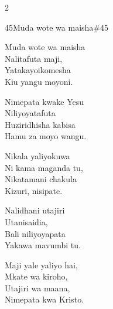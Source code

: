 \documentclass{article}
\begin{document}
\begin{multicols}{2}
\begin{hymn}{45}{Muda wote wa maisha}{\#45}
\begin{stanza}
Muda wote wa maisha\\
Nalitafuta maji,\\
Yatakayoikomesha\\
Kiu yangu moyoni.
\end{stanza}
\begin{chorus}
Nimepata kwake Yesu\\
Niliyoyatafuta\\
Huziridhisha kabisa\\
Hamu za moyo wangu.
\end{chorus}
\begin{stanza}
Nikala yaliyokuwa\\
Ni kama maganda tu,\\
Nikatamani chakula\\
Kizuri, nisipate.
\end{stanza}
\begin{stanza}
Nalidhani utajiri\\
Utanisaidia,\\
Bali niliyoyapata\\
Yakawa mavumbi tu.
\end{stanza}
\begin{stanza}
Maji yale yaliyo hai,\\
Mkate wa kiroho,\\
Utajiri wa maana,\\
Nimepata kwa Kristo.
\end{stanza}
\end{hymn}


\end{multicols}
\end{document}
